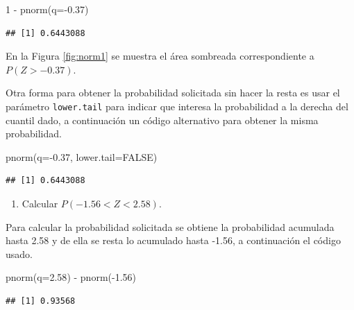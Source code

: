 \documentclass[
]{book}
\makeatletter
\newenvironment{Shaded}{\begin{snugshade}}{\end{snugshade}}
\newcommand{\AttributeTok}[1]{\textcolor[rgb]{0.77,0.63,0.00}{#1}}
\newcommand{\ConstantTok}[1]{\textcolor[rgb]{0.00,0.00,0.00}{#1}}
\newcommand{\DecValTok}[1]{\textcolor[rgb]{0.00,0.00,0.81}{#1}}
\newcommand{\FloatTok}[1]{\textcolor[rgb]{0.00,0.00,0.81}{#1}}
\newcommand{\FunctionTok}[1]{\textcolor[rgb]{0.00,0.00,0.00}{#1}}
\newcommand{\NormalTok}[1]{#1}
\newcommand{\SpecialCharTok}[1]{\textcolor[rgb]{0.00,0.00,0.00}{#1}}
\providecommand{\tightlist}{%
  \setlength{\itemsep}{0pt}\setlength{\parskip}{0pt}}
\newenvironment{kframe}{%
\medskip{}
\setlength{\fboxsep}{.8em}
 \def\at@end@of@kframe{}%
 \ifinner\ifhmode%
  \def\at@end@of@kframe{\end{minipage}}%
  \begin{minipage}{\columnwidth}%
 \fi\fi%
 \def\FrameCommand##1{\hskip\@totalleftmargin \hskip-\fboxsep
 \colorbox{shadecolor}{##1}\hskip-\fboxsep
     \hskip-\linewidth \hskip-\@totalleftmargin \hskip\columnwidth}%
 \MakeFramed {\advance\hsize-\width
   \@totalleftmargin\z@ \linewidth\hsize
   \@setminipage}}%
 {\par\unskip\endMakeFramed%
 \at@end@of@kframe}
\renewenvironment{Shaded}{\begin{kframe}}{\end{kframe}}
\makeatother
\begin{document}
\begin{Shaded}
\begin{Highlighting}[]
\DecValTok{1} \SpecialCharTok{{-}} \FunctionTok{pnorm}\NormalTok{(}\AttributeTok{q=}\SpecialCharTok{{-}}\FloatTok{0.37}\NormalTok{)}
\end{Highlighting}
\end{Shaded}

\begin{verbatim}
## [1] 0.6443088
\end{verbatim}

En la Figura \ref{fig:norm1} se muestra el área sombreada correspondiente a \(P(Z > -0.37)\).

Otra forma para obtener la probabilidad solicitada sin hacer la resta es usar el parámetro \texttt{lower.tail} para indicar que interesa la probabilidad a la derecha del cuantil dado, a continuación un código alternativo para obtener la misma probabilidad.

\begin{Shaded}
\begin{Highlighting}[]
\FunctionTok{pnorm}\NormalTok{(}\AttributeTok{q=}\SpecialCharTok{{-}}\FloatTok{0.37}\NormalTok{, }\AttributeTok{lower.tail=}\ConstantTok{FALSE}\NormalTok{)}
\end{Highlighting}
\end{Shaded}

\begin{verbatim}
## [1] 0.6443088
\end{verbatim}

\begin{enumerate}
\def\labelenumi{\arabic{enumi})}
\setcounter{enumi}{2}
\tightlist
\item
  Calcular \(P(-1.56 < Z < 2.58)\).
\end{enumerate}

Para calcular la probabilidad solicitada se obtiene la probabilidad acumulada hasta 2.58 y de ella se resta lo acumulado hasta -1.56, a continuación el código usado.

\begin{Shaded}
\begin{Highlighting}[]
\FunctionTok{pnorm}\NormalTok{(}\AttributeTok{q=}\FloatTok{2.58}\NormalTok{) }\SpecialCharTok{{-}} \FunctionTok{pnorm}\NormalTok{(}\SpecialCharTok{{-}}\FloatTok{1.56}\NormalTok{)}
\end{Highlighting}
\end{Shaded}

\begin{verbatim}
## [1] 0.93568
\end{verbatim}
\end{document}
